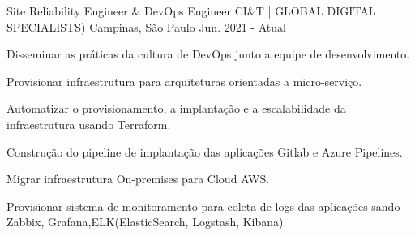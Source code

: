 

\begin{cventries}

  \cventry
    {Site Reliability Engineer \& DevOps Engineer} %
    {CI&T | GLOBAL DIGITAL SPECIALISTS)} %
    {Campinas, São Paulo} %
    {Jun. 2021 - Atual} %
    {
      \begin{cvitems} %
        \item {Disseminar as práticas da cultura de DevOps junto a equipe de desenvolvimento.}
        \item {Provisionar infraestrutura para arquiteturas orientadas a micro-serviço.}
        \item {Automatizar o provisionamento, a implantação e a escalabilidade da infraestrutura usando Terraform.}
        \item {Construção do pipeline de implantação das aplicações Gitlab e Azure Pipelines.}
        \item {Migrar infraestrutura On-premises para Cloud AWS.}
        \item {Provisionar sistema de monitoramento para coleta de logs das aplicações sando
        Zabbix, Grafana,ELK(ElasticSearch, Logstash, Kibana).}
      \end{cvitems}
    }


\end{cventries}
